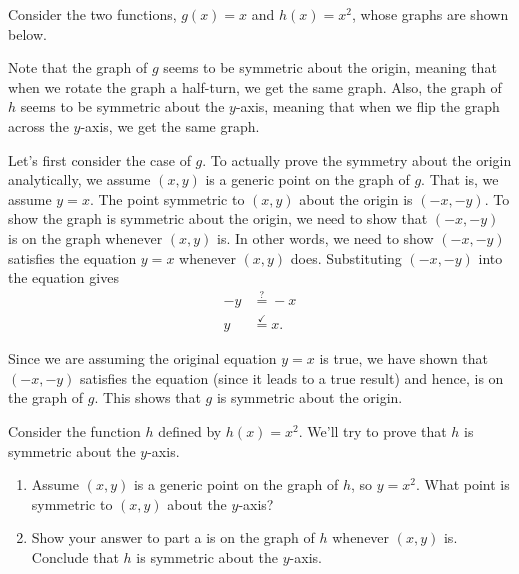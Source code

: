 \documentclass[nooutcomes]{ximera}
\begin{document}
Consider the two functions, $g(x) = x$ and $h(x) = x^2$, whose graphs are shown below.
\begin{image}

\end{image}

Note that the graph of $g$ seems to be symmetric about the origin, meaning that when we rotate the graph a half-turn, we get the same graph. Also, the graph of $h$ seems to be symmetric about the $y$-axis, meaning that when we flip the graph across the $y$-axis, we get the same graph. 

Let's first consider the case of $g$. To actually prove the symmetry about the origin analytically, we assume $(x,y)$ is a generic point on the graph of $g$. That is, we assume  $y = x$.  The point symmetric to $(x,y)$ about the origin is $(-x,-y)$.  To show the graph is symmetric about the origin, we need to show that $(-x,-y)$ is on the graph whenever $(x,y)$ is.  In other words, we need to show $(-x,-y)$ satisfies the equation $y = x$ whenever $(x,y)$ does.  Substituting $(-x, -y)$ into the equation gives
\begin{align*}
-y &\stackrel{?}{=} -x \\
y &\stackrel{\checkmark}{=} x.
\end{align*}

Since we are assuming the original equation $y = x$ is true, we have shown that $(-x, -y)$ satisfies the equation (since it leads to a true result) and hence, is on the graph of $g$. This shows that $g$ is symmetric about the origin.



\begin{exploration}
Consider the function $h$ defined by $h(x) = x^2$. We'll try to prove that $h$ is symmetric about the $y$-axis. 
\begin{enumerate}[label=\alph*.]
\item Assume $(x, y)$ is a generic point on the graph of $h$, so $y = x^2$. What point is symmetric to $(x, y)$ about the $y$-axis?
\item Show your answer to part a is on the graph of $h$ whenever $(x, y)$ is. Conclude that $h$ is symmetric about the $y$-axis. 
\end{enumerate}
\end{exploration}
\end{document}

